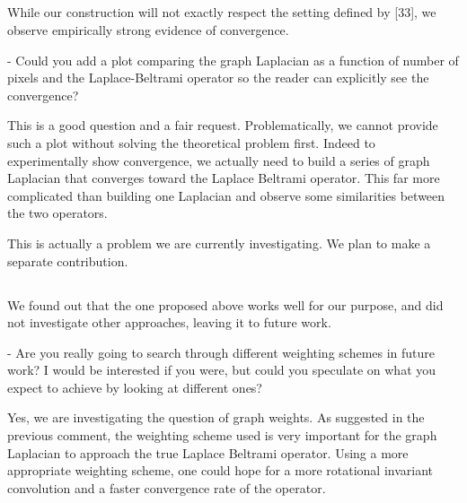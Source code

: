 \documentclass[12pt,a4paper]{article}
\newcommand{\nati}[1]{{\color[rgb]{.1,.6,.1}{NP: #1}}}
\newcommand{\1}{\b{1}}              %
\newcommand{\0}{\b{0}}              %
\begin{document}
\subsection{}
\begin{mdframed}[style=comment]
While our construction will not exactly respect the setting defined by [33], we observe empirically strong evidence of convergence.

- Could you add a plot comparing the graph Laplacian as a function of number of pixels and the Laplace-Beltrami operator so the reader can explicitly see the convergence?
\end{mdframed}

This is a good question and a fair request. Problematically, we cannot provide such a plot without solving the theoretical problem first. Indeed to experimentally show convergence, we actually need to build a series of graph Laplacian that converges toward the Laplace Beltrami operator. This far more complicated than building one Laplacian and observe some similarities between the two operators.

This is actually a problem we are currently investigating. We plan to make a separate contribution.


\subsection{}

\begin{mdframed}[style=comment]
We found out that the one proposed above works well for our purpose, and did not investigate other approaches, leaving it to future work.

- Are you really going to search through different weighting schemes in future work? I would be interested if you were, but could you speculate on what you expect to achieve by looking at different ones?
\end{mdframed}

Yes, we are investigating the question of graph weights.
As suggested in the previous comment, the weighting scheme used is very important for the graph Laplacian to approach the true Laplace Beltrami operator. Using a more appropriate weighting scheme, one could hope for a more rotational invariant convolution and a faster convergence rate of the operator.
\nati{@michael, how much shall we say here?}
\end{document}
